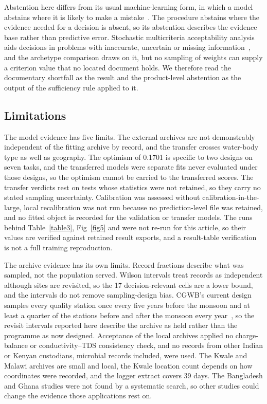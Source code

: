 \documentclass[10pt,letterpaper]{article}
\begin{document}
Abstention here differs from its usual machine-learning form, in which a model abstains where it is likely to make a mistake~\cite{Hendrickx2024}. The procedure abstains where the evidence needed for a decision is absent, so its abstention describes the evidence base rather than predictive error. Stochastic multicriteria acceptability analysis aids decisions in problems with inaccurate, uncertain or missing information~\cite{TervonenLahdelma2007}, and the archetype comparison draws on it, but no sampling of weights can supply a criterion value that no located document holds. We therefore read the documentary shortfall as the result and the product-level abstention as the output of the sufficiency rule applied to it.

\subsection*{Limitations}

The model evidence has five limits. The external archives are not demonstrably independent of the fitting archive by record, and the transfer crosses water-body type as well as geography. The optimism of 0.1701 is specific to two designs on seven tasks, and the transferred models were separate fits never evaluated under those designs, so the optimism cannot be carried to the transferred scores. The transfer verdicts rest on tests whose statistics were not retained, so they carry no stated sampling uncertainty. Calibration was assessed without calibration-in-the-large, local recalibration was not run because no prediction-level file was retained, and no fitted object is recorded for the validation or transfer models. The runs behind Table~\ref{table3}, Fig~\ref{fig5} and  were not re-run for this article, so their values are verified against retained result exports, and a result-table verification is not a full training reproduction.

The archive evidence has its own limits. Record fractions describe what was sampled, not the population served. Wilson intervals treat records as independent although sites are revisited, so the 17 decision-relevant cells are a lower bound, and the intervals do not remove sampling-design bias. CGWB's current design samples every quality station once every five years before the monsoon and at least a quarter of the stations before and after the monsoon every year~\cite{CGWB-SOP-GWQDataAnalysis}, so the revisit intervals reported here describe the archive as held rather than the programme as now designed. Acceptance of the local archives applied no charge-balance or conductivity--TDS consistency check, and no records from other Indian or Kenyan custodians, microbial records included, were used. The Kwale and Malawi archives are small and local, the Kwale location count depends on how coordinates were recorded, and the logger extract covers 39 days. The Bangladesh and Ghana studies were not found by a systematic search, so other studies could change the evidence those applications rest on.
\end{document}
